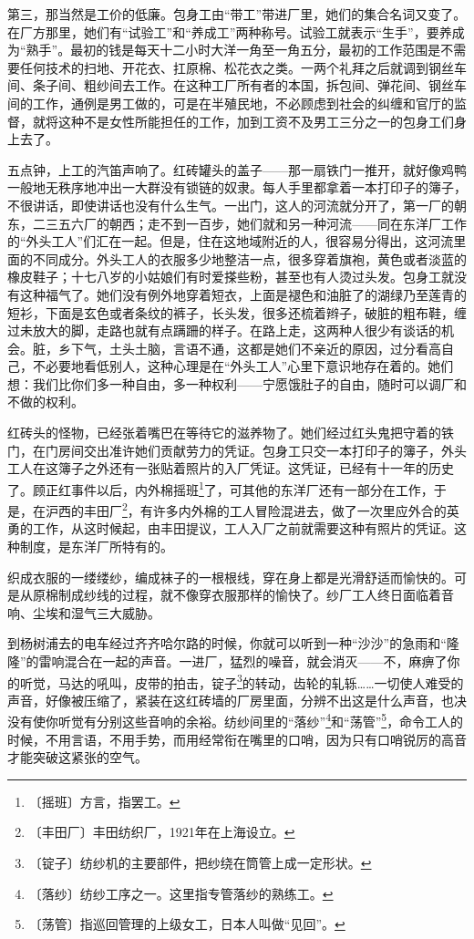 \documentclass[12pt,UTF-8,openany]{ctexbook}
\begin{document}
\begin{large}
    第三，那当然是工价的低廉。包身工由“带工”带进厂里，她们的集合名词又变了。在厂方那里，她们有“试验工”和“养成工”两种称号。试验工就表示“生手”，要养成为“熟手”。最初的钱是每天十二小时大洋一角至一角五分，最初的工作范围是不需要任何技术的扫地、开花衣、扛原棉、松花衣之类。一两个礼拜之后就调到钢丝车间、条子间、粗纱间去工作。在这种工厂所有者的本国，拆包间、弹花间、钢丝车间的工作，通例是男工做的，可是在半殖民地，不必顾虑到社会的纠缠和官厅的监督，就将这种不是女性所能担任的工作，加到工资不及男工三分之一的包身工们身上去了。
    
    五点钟，上工的汽笛声响了。红砖罐头的盖子——那一扇铁门一推开，就好像鸡鸭一般地无秩序地冲出一大群没有锁链的奴隶。每人手里都拿着一本打印子的簿子，不很讲话，即使讲话也没有什么生气。一出门，这人的河流就分开了，第一厂的朝东，二三五六厂的朝西；走不到一百步，她们就和另一种河流——同在东洋厂工作的“外头工人”们汇在一起。但是，住在这地域附近的人，很容易分得出，这河流里面的不同成分。外头工人的衣服多少地整洁一点，很多穿着旗袍，黄色或者淡蓝的橡皮鞋子；十七八岁的小姑娘们有时爱搽些粉，甚至也有人烫过头发。包身工就没有这种福气了。她们没有例外地穿着短衣，上面是褪色和油脏了的湖绿乃至莲青的短衫，下面是玄色或者条纹的裤子，长头发，很多还梳着辫子，破脏的粗布鞋，缠过未放大的脚，走路也就有点蹒跚的样子。在路上走，这两种人很少有谈话的机会。脏，乡下气，土头土脑，言语不通，这都是她们不亲近的原因，过分看高自己，不必要地看低别人，这种心理是在“外头工人”心里下意识地存在着的。她们想：我们比你们多一种自由，多一种权利——宁愿饿肚子的自由，随时可以调厂和不做的权利。
    
    红砖头的怪物，已经张着嘴巴在等待它的滋养物了。她们经过红头鬼把守着的铁门，在门房间交出准许她们贡献劳力的凭证。包身工只交一本打印子的簿子，外头工人在这簿子之外还有一张贴着照片的入厂凭证。这凭证，已经有十一年的历史了。顾正红事件以后，内外棉摇班\footnote{〔摇班〕方言，指罢工。}了，可其他的东洋厂还有一部分在工作，于是，在沪西的丰田厂\footnote{〔丰田厂〕丰田纺织厂，1921年在上海设立。}，有许多内外棉的工人冒险混进去，做了一次里应外合的英勇的工作，从这时候起，由丰田提议，工人入厂之前就需要这种有照片的凭证。这种制度，是东洋厂所特有的。
    
    织成衣服的一缕缕纱，编成袜子的一根根线，穿在身上都是光滑舒适而愉快的。可是从原棉制成纱线的过程，就不像穿衣服那样的愉快了。纱厂工人终日面临着音响、尘埃和湿气三大威胁。
    
    到杨树浦去的电车经过齐齐哈尔路的时候，你就可以听到一种“沙沙”的急雨和“隆隆”的雷响混合在一起的声音。一进厂，猛烈的噪音，就会消灭——不，麻痹了你的听觉，马达的吼叫，皮带的拍击，锭子\footnote{〔锭子〕纺纱机的主要部件，把纱绕在筒管上成一定形状。}的转动，齿轮的轧轹……一切使人难受的声音，好像被压缩了，紧装在这红砖墙的厂房里面，分辨不出这是什么声音，也决没有使你听觉有分别这些音响的余裕。纺纱间里的“落纱”\footnote{〔落纱〕纺纱工序之一。这里指专管落纱的熟练工。}和“荡管”\footnote{〔荡管〕指巡回管理的上级女工，日本人叫做“见回”。}，命令工人的时候，不用言语，不用手势，而用经常衔在嘴里的口哨，因为只有口哨锐厉的高音才能突破这紧张的空气。
    

\end{large}
\end{document}
